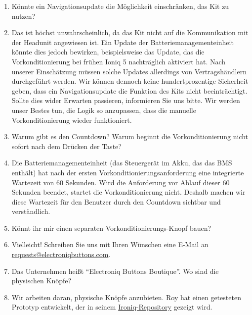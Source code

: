 \documentclass[superscriptaddress,onecolumn,floatfix]{revtex4-2}
\begin{document}
\begin{enumerate}
  \item[Frage:] Könnte ein Navigationsupdate die Möglichkeit einschränken, das Kit zu nutzen?
  \item[Antwort:] Das ist höchst unwahrscheinlich, da das Kit nicht auf die Kommunikation mit der Headunit angewiesen ist. Ein Update der Batteriemanagementeinheit könnte dies jedoch bewirken, beispielsweise das Update, das die Vorkonditionierung bei frühen Ioniq 5 nachträglich aktiviert hat. Nach unserer Einschätzung müssen solche Updates allerdings von Vertragshändlern durchgeführt werden. Wir können dennoch keine hundertprozentige Sicherheit geben, dass ein Navigationsupdate die Funktion des Kits nicht beeinträchtigt. Sollte dies wider Erwarten passieren, informieren Sie uns bitte. Wir werden unser Bestes tun, die Logik so anzupassen, dass die manuelle Vorkonditionierung wieder funktioniert.
  \item[Frage:] Warum gibt es den Countdown? Warum beginnt die Vorkonditionierung nicht sofort nach dem Drücken der Taste?
  \item[Antwort:] Die Batteriemanagementeinheit (das Steuergerät im Akku, das das BMS enthält) hat nach der ersten Vorkonditionierungsanforderung eine integrierte Wartezeit von 60 Sekunden. Wird die Anforderung vor Ablauf dieser 60 Sekunden beendet, startet die Vorkonditionierung nicht. Deshalb machen wir diese Wartezeit für den Benutzer durch den Countdown sichtbar und verständlich.
  \item[Frage:] Könnt ihr mir einen separaten Vorkonditionierungs-Knopf bauen?
  \item[Antwort:] Vielleicht! Schreiben Sie uns mit Ihren Wünschen eine E-Mail an \href{mailto:requests@electroniqbuttons.com}{requests@electroniqbuttons.com}.
  \item[Frage:] Das Unternehmen heißt ``Electroniq Buttons Boutique''. Wo sind die physischen Knöpfe?
  \item[Antwort:] Wir arbeiten daran, physische Knöpfe anzubieten. Roy hat einen getesteten Prototyp entwickelt, der in seinem \href{https://github.com/dragz/ironiq}{Ironiq-Repository} gezeigt wird.
\end{enumerate}
\appendix 

{}
\end{document}
